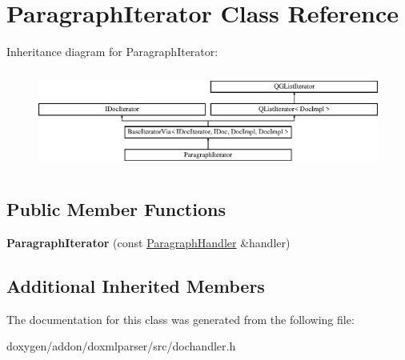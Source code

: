 \hypertarget{class_paragraph_iterator}{}\section{Paragraph\+Iterator Class Reference}
\label{class_paragraph_iterator}
Inheritance diagram for Paragraph\+Iterator\+:\begin{figure}[H]
\begin{center}
\leavevmode
\includegraphics[height=3.294118cm]{class_paragraph_iterator}
\end{center}
\end{figure}
\subsection*{Public Member Functions}
\begin{DoxyCompactItemize}
\item 
\mbox{\label{class_paragraph_iterator_a3ef1adcb5f04848ebde0e9b3e064530c}} 
{\bfseries Paragraph\+Iterator} (const \mbox{\hyperlink{class_paragraph_handler}{Paragraph\+Handler}} \&handler)
\end{DoxyCompactItemize}
\subsection*{Additional Inherited Members}


The documentation for this class was generated from the following file\+:\begin{DoxyCompactItemize}
\item 
doxygen/addon/doxmlparser/src/dochandler.\+h\end{DoxyCompactItemize}
